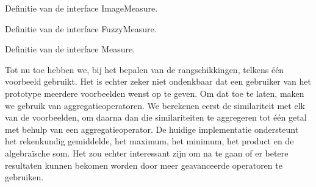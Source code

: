 \begin{code}[!b]
\vspace{5pt}
\begin{lgrind}

\end{lgrind}
\vspace{5pt}
\caption{\label{code:imagemeasure}Definitie van de interface {\klassefont ImageMeasure}.}
\end{code}
%
\begin{code}[!b]
\vspace{5pt}
\begin{lgrind}

\end{lgrind}
\vspace{5pt}
\caption{\label{code:fuzzymeasure}Definitie van de interface {\klassefont FuzzyMeasure}.}
\end{code}
%
\begin{code}[!b]
\vspace{5pt}
\begin{lgrind}

\end{lgrind}
\vspace{5pt}
\caption{\label{code:measure}Definitie van de interface {\klassefont Measure}.}
\end{code}

Tot nu toe hebben we, bij het bepalen van de rangschikkingen, telkens \'e\'en 
voorbeeld gebruikt. Het is echter zeker niet ondenkbaar dat een gebruiker
van het prototype meerdere voorbeelden wenst op te geven. Om dat toe te laten,
maken we gebruik van aggregatieoperatoren. We berekenen eerst de similariteit met
elk van de voorbeelden, om daarna dan die similariteiten te aggregeren tot \'e\'en
getal met behulp van een aggregatieoperator. De huidige implementatie 
ondersteunt het rekenkundig gemiddelde, het maximum, het minimum, het product en de 
algebra\"ische som. Het zou echter interessant zijn om na te gaan of er betere
resultaten kunnen bekomen worden door meer geavanceerde operatoren te gebruiken.

